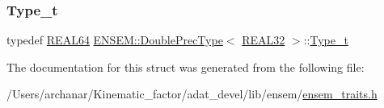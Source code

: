 \mbox{\label{structENSEM_1_1DoublePrecType_3_01REAL32_01_4_ae855602a46f5a89750f4c0c7d39277e8}} 
\subsubsection{\texorpdfstring{Type\_t}{Type\_t}\hspace{0.1cm}{\footnotesize\ttfamily [2/2]}}
{\footnotesize\ttfamily typedef \mbox{\hyperlink{namespaceENSEM_a85b215b9f1f43715aebee01718e25082}{R\+E\+A\+L64}} \mbox{\hyperlink{structENSEM_1_1DoublePrecType}{E\+N\+S\+E\+M\+::\+Double\+Prec\+Type}}$<$ \mbox{\hyperlink{namespaceENSEM_a7540d01191172323e9073283d772576d}{R\+E\+A\+L32}} $>$\+::\mbox{\hyperlink{structENSEM_1_1DoublePrecType_3_01REAL32_01_4_ae855602a46f5a89750f4c0c7d39277e8}{Type\+\_\+t}}}



The documentation for this struct was generated from the following file\+:\begin{DoxyCompactItemize}
\item 
/\+Users/archanar/\+Kinematic\+\_\+factor/adat\+\_\+devel/lib/ensem/\mbox{\hyperlink{lib_2ensem_2ensem__traits_8h}{ensem\+\_\+traits.\+h}}\end{DoxyCompactItemize}
